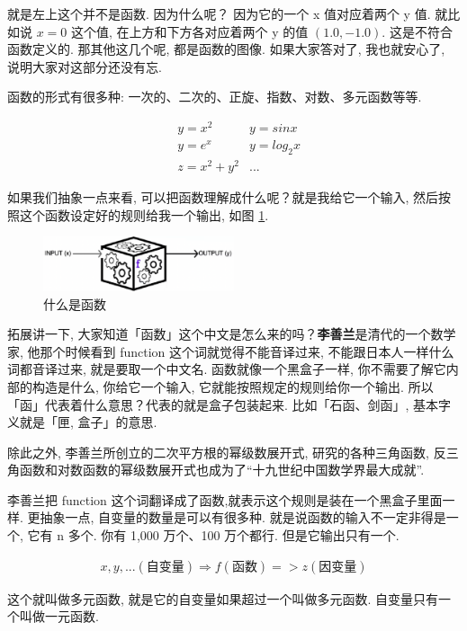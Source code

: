 就是左上这个并不是函数. 因为什么呢？ 因为它的一个 x 值对应着两个 y 值. 就比如说 $x=0$ 这个值, 在上方和下方各对应着两个 y 的值 $(1.0, -1.0)$. 这是不符合函数定义的. 那其他这几个呢, 都是函数的图像. 如果大家答对了, 我也就安心了, 说明大家对这部分还没有忘. 

函数的形式有很多种: 一次的、二次的、正旋、指数、对数、多元函数等等. 

\begin{align*}
    & y=x^2 & y=sinx \\
    & y=e^x & y={log_2}x \\
    & z=x^2+y^2 & ...
\end{align*}

如果我们抽象一点来看, 可以把函数理解成什么呢？就是我给它一个输入, 然后按照这个函数设定好的规则给我一个输出, 如图 \ref{fig:img3_2}. 

\begin{figure}[ht]
  \centering
  \includegraphics[width=0.5\textwidth]{asset/9f20645c-ef49-4ffd-9178-d01b67c74249.png}
  \caption{什么是函数}
  \label{fig:img3_2}
\end{figure}

拓展讲一下, 大家知道「函数」这个中文是怎么来的吗？\textbf{李善兰}是清代的一个数学家, 他那个时候看到 function 这个词就觉得不能音译过来, 不能跟日本人一样什么词都音译过来, 就是要取一个中文名. 函数就像一个黑盒子一样, 你不需要了解它内部的构造是什么, 你给它一个输入, 它就能按照规定的规则给你一个输出. 所以「函」代表着什么意思？代表的就是盒子包装起来. 比如「石函、剑函」, 基本字义就是「匣, 盒子」的意思. 

除此之外, 李善兰所创立的二次平方根的幂级数展开式, 研究的各种三角函数, 反三角函数和对数函数的幂级数展开式也成为了“十九世纪中国数学界最大成就”. 

李善兰把 function 这个词翻译成了函数,就表示这个规则是装在一个黑盒子里面一样. 更抽象一点, 自变量的数量是可以有很多种. 就是说函数的输入不一定非得是一个, 它有 n 多个. 你有 1,000 万个、100 万个都行. 但是它输出只有一个. 

\begin{align*}
    x,y,...(\mbox{自变量}) \Rightarrow f(\mbox{函数}) => z(\mbox{因变量})
\end{align*}

这个就叫做多元函数, 就是它的自变量如果超过一个叫做多元函数. 自变量只有一个叫做一元函数. 

